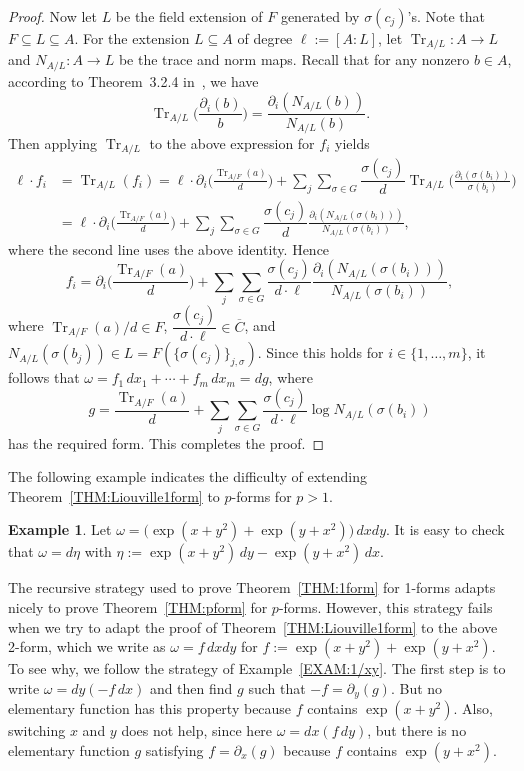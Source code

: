 \documentclass{amsart}
\theoremstyle{definition}
\newtheorem{example}[thm]{Example}
\numberwithin{equation}{section}
\numberwithin{thm}{section}
\begin{document}
\begin{proof}
Now let $L$ be the field extension of $F$ generated by $\sigma(c_j)$'s.  Note that $F \subseteq L \subseteq A$.  For the extension $L \subseteq A$ of degree $\ell:=[A:L]$, let $\operatorname{Tr}_{A/L} \colon A \rightarrow L$ and $N_{A/L} \colon A \rightarrow L$ be the trace and norm maps.  Recall that for any nonzero $b \in A$, according to Theorem~3.2.4 in~\cite{Bronstein}, we have
\[
 \operatorname{Tr}_{A/L}\Big(\frac{\partial_i(b)}{b}\Big) = \frac{\partial_i(N_{A/L}(b))}{N_{A/L}(b)}.
 \]
 Then applying  $\operatorname{Tr}_{A/L}$ to the above expression for $f_i$ yields
\begin{align*}
\ell \cdot f_i &= \operatorname{Tr}_{A/L} (f_i) = \ell \cdot \partial_i\Big(\frac{\operatorname{Tr}_{A/F}(a)}{d}\Big) + \sum_j \sum_{\sigma\in G} \dfrac{\sigma(c_j)}{d} \operatorname{Tr}_{A/L} \Big(\frac{\partial_i(\sigma(b_i))}{\sigma(b_i)}\Big)\\
&= \ell \cdot \partial_i\Big(\frac{\operatorname{Tr}_{A/F}(a)}{d}\Big) + \sum_j \sum_{\sigma\in G} \dfrac{\sigma(c_j)}{d} \frac{\partial_i(N_{A/L}(\sigma(b_i)))}{N_{A/L}(\sigma(b_i))},
\end{align*}
where the second line uses the above identity.  Hence
\[
f_i = \partial_i\Big(\frac{\operatorname{Tr}_{A/F}(a)}{d}\Big) + \sum_j \sum_{\sigma\in G} \dfrac{\sigma(c_j)}{d\cdot \ell} \frac{\partial_i(N_{A/L}(\sigma(b_i)))}{N_{A/L}(\sigma(b_i))},
\]
where $\operatorname{Tr}_{A/F}(a)/d \in F$, $ \dfrac{\sigma(c_j)}{d\cdot \ell} \in \overline{C}$, and $N_{A/L}(\sigma(b_j)) \in L = F(\{\sigma(c_j)\}_{j,\sigma})$. Since this holds for $i \in \{1,\dots,m\}$, it follows that $\omega = f_1\,dx_1 + \cdots +  f_m\,dx_m  = dg$, where 
\[
g = \frac{\operatorname{Tr}_{A/F}(a)}{d}  +  \sum_j \sum_{\sigma\in G} \dfrac{\sigma(c_j)}{d\cdot \ell} \log N_{A/L}(\sigma(b_i))
\]
has the required form. This completes the proof.
\end{proof}

The following example indicates the difficulty of extending Theorem~\ref{THM:Liouville1form} to $p$-forms for $p> 1$.

\begin{example}
Let $\omega = \bigl(\exp(x+y^2) + \exp(y+x^2)\bigr) \, dxdy$. It is easy to check that $\omega = d\eta$ with $\eta :=\exp(x+y^2) \, dy - \exp(y+x^2)\,dx$.  
		
	The recursive strategy used to prove Theorem~\ref{THM:1form} for 1-forms adapts nicely to prove Theorem~\ref{THM:pform} for $p$-forms.  However, this strategy fails when we try to adapt the proof of Theorem~\ref{THM:Liouville1form} to the above 2-form, which we write as  $\omega = f\, dxdy$ for $f := \exp(x+y^2) + \exp(y+x^2)$.  To see why, we follow the strategy of Example~\ref{EXAM:1/xy}.  The first step is to write $\omega = dy({-}f\,dx)$ and then find $g$ such that ${-}f = \partial_{y}(g)$.  But no elementary function has this property because $f$ contains $\exp(x+y^2)$.  Also, switching $x$ and $y$ does not help, since here $\omega = dx({}f\,dy)$, but there is no elementary function $g$ satisfying $f = \partial_{x}(g)$ because $f$ contains $\exp(y+x^2)$.
\end{example}
\end{document}
